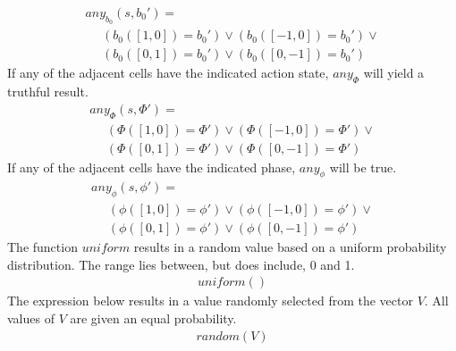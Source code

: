 \documentclass{acm_proc_article-sp}
\begin{document}
\begin{displaymath} \begin{array}{l}
any_{b_0}(s, b_0') = \\
\hspace{16pt} (b_0([1, 0]) = b_0') \vee (b_0([-1, 0]) = b_0') \vee \\
\hspace{16pt} (b_0([0, 1]) = b_0') \vee (b_0([0, -1]) = b_0') 
\end{array} \end{displaymath}
If any of the adjacent cells have the indicated action state, $any_\Phi$
will yield a truthful result. 
\begin{displaymath} \begin{array}{l}
any_\Phi(s, \Phi') = \\
\hspace{16pt} (\Phi([1, 0]) = \Phi') \vee (\Phi([-1, 0]) = \Phi') \vee \\
\hspace{16pt} (\Phi([0, 1]) = \Phi') \vee (\Phi([0, -1]) = \Phi') 
\end{array} \end{displaymath}
If any of the adjacent cells have the indicated phase, $any_\phi$
will be true. 
\begin{displaymath} \begin{array}{l}
any_\phi(s, \phi') = \\
\hspace{16pt} (\phi([1, 0]) = \phi') \vee (\phi([-1, 0]) = \phi') \vee \\
\hspace{16pt} (\phi([0, 1]) = \phi') \vee (\phi([0, -1]) = \phi') 
\end{array} \end{displaymath}
The function $uniform$ results in a random value based on a uniform 
probability distribution.  The range lies between, but does include, 
0 and 1.
\begin{displaymath} \begin{array}{l}
uniform()
\end{array} \end{displaymath}
The expression below results in a value randomly selected from the 
vector $V$.  All values of $V$ are given an equal probability.
\begin{displaymath} \begin{array}{l}
random(V)
\end{array} \end{displaymath}
\end{document}
